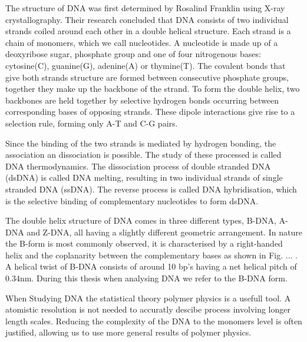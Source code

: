The structure of DNA was first determined by Rosalind Franklin using X-ray
crystallography. Their research concluded that DNA consists of
two individual strands coiled around each other in a double helical structure. Each
strand is a chain of monomers, which we call nucleotides. A nucleotide is made up of a
deoxyribose sugar, phosphate group and one of four nitrogenous bases: cytosine(C),
guanine(G), adenine(A) or thymine(T). The covalent bonds that give both strands structure
are formed between consecutive phosphate groups, together they make up the backbone of
the strand. To form the double helix, two backbones are held together by
selective hydrogen bonds occurring between corresponding bases of opposing strands. These
dipole interactions give rise to a selection rule, forming only A-T and C-G pairs.

Since the binding of the two strands is mediated by hydrogen bonding, the association an
dissociation is possible. The study of these processed is called DNA thermodynamics. The
dissociation process of double stranded DNA (dsDNA) is called DNA melting, resulting in
two individual strands of single stranded DNA (ssDNA). The reverse process is called DNA
hybridisation, which is the selective binding of complementary nucleotides to form dsDNA.

The double helix structure of DNA comes in three different types, B-DNA, A-DNA and Z-DNA,
all having a slightly different geometric arrangement. In nature the B-form is most
commonly observed, it is characterised by a right-handed helix and the coplanarity
between the complementary bases as shown in Fig. ... . A helical twist of B-DNA consists
of around 10 bp's having a net helical pitch of 0.34nm. During this thesis when analysing
DNA we refer to the B-DNA form.

When Studying DNA the statistical theory polymer physics is a usefull tool. A atomistic
resolution is not needed to accuratly descibe process involving longer length scales.
Reducing the complexity of the DNA to the monomers level is often justified, allowing us
to use more general results of polymer physics.


